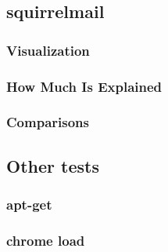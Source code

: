 \documentclass[10pt]{article}
\begin{document}
\subsection{squirrelmail}
\subsubsection{Visualization}
\subsubsection{How Much Is Explained}
\subsubsection{Comparisons}
\subsection{Other tests}
\subsubsection{apt-get}
\subsubsection{chrome load}
\end{document}
